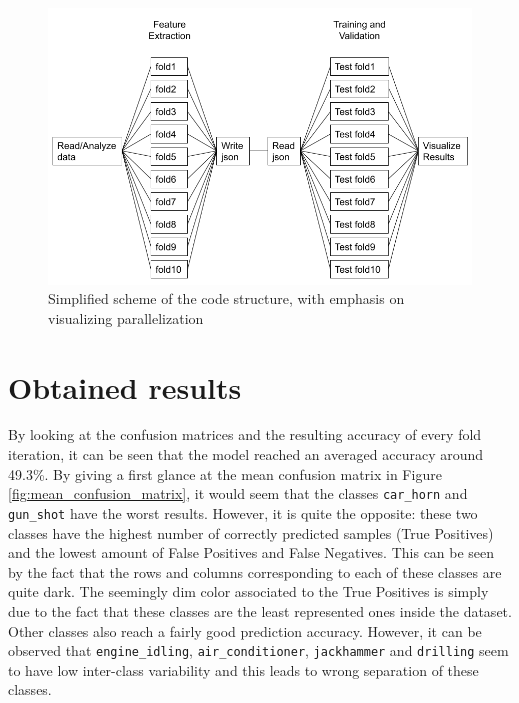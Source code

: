 \documentclass{article}
\newcommand{\code}{\texttt}
\begin{document}
\begin{figure}[h]
    \centering
    \includegraphics[scale=0.4]{img/Simplified_Scheme.png}
    \caption{Simplified scheme of the code structure, with emphasis on visualizing parallelization}
    \label{fig:parallelization_scheme}
\end{figure}

\section{Obtained results}
By looking at the confusion matrices and the resulting accuracy of every fold iteration, it can be seen that the model reached an averaged accuracy around 49.3\%. By giving a first glance at the mean confusion matrix in Figure \ref{fig:mean_confusion_matrix}, it would seem that the classes \code{car\_horn} and \code{gun\_shot} have the worst results. However, it is quite the opposite: these two classes have the highest number of correctly predicted samples (True Positives) and the lowest amount of False Positives and False Negatives. This can be seen by the fact that the rows and columns corresponding to each of these classes are quite dark. The seemingly dim color associated to the True Positives is simply due to the fact that these classes are the least represented ones inside the dataset. 
Other classes also reach a fairly good prediction accuracy. However, it can be observed that \code{engine\_idling}, \code{air\_conditioner}, \code{jackhammer} and \code{drilling} seem to have low inter-class variability and this leads to wrong separation of these classes. 
\end{document}
